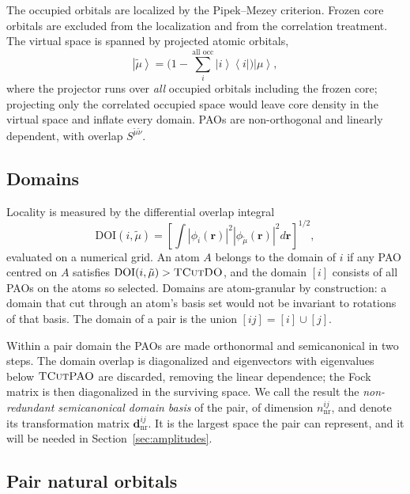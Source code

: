 \documentclass[aip,jcp,amsmath,amssymb,preprint,superscriptaddress]{revtex4-2}%
\newcommand{\ket}[1]{\left|#1\right\rangle}
\newcommand{\bra}[1]{\left\langle#1\right|}
\newcommand{\pao}[1]{\tilde{#1}}
\newcommand{\TCut}[1]{\textsc{TCut#1}}
\begin{document}
The occupied orbitals are localized by the Pipek--Mezey
criterion.\cite{PipekMezey1989} Frozen core orbitals are excluded from the
localization and from the correlation treatment. The virtual space is spanned
by projected atomic orbitals,
%
\begin{equation}
  \ket{\pao{\mu}} = \Big(1 - \sum_{i}^{\text{all occ}}\ket{i}\bra{i}\Big)\ket{\mu},
  \label{eq:pao}
\end{equation}
%
where the projector runs over \emph{all} occupied orbitals including the
frozen core; projecting only the correlated occupied space would leave core
density in the virtual space and inflate every domain. PAOs are non-orthogonal
and linearly dependent, with overlap $S^{\pao{\mu}\pao{\nu}}$.

\subsection{Domains}

Locality is measured by the differential overlap
integral\cite{Pinski2015}
%
\begin{equation}
  \mathrm{DOI}(i,\pao{\mu}) =
    \left[\int \left|\phi_i(\mathbf{r})\right|^2
                \left|\phi_{\pao{\mu}}(\mathbf{r})\right|^2
          d\mathbf{r}\right]^{1/2},
  \label{eq:doi}
\end{equation}
%
evaluated on a numerical grid. An atom $A$ belongs to the domain of $i$ if any
PAO centred on $A$ satisfies $\mathrm{DOI}(i,\pao{\mu}) > \TCut{DO}$, and the
domain $[i]$ consists of all PAOs on the atoms so selected. Domains are
atom-granular by construction: a domain that cut through an atom's basis set
would not be invariant to rotations of that basis. The domain of a pair is the
union $[ij] = [i]\cup[j]$.

Within a pair domain the PAOs are made orthonormal and semicanonical in two
steps. The domain overlap is diagonalized and eigenvectors with eigenvalues
below $\TCut{PAO}$ are discarded, removing the linear dependence; the Fock
matrix is then diagonalized in the surviving space. We call the result the
\emph{non-redundant semicanonical domain basis} of the pair, of dimension
$n^{ij}_{\text{nr}}$, and denote its transformation matrix $\mathbf{d}^{ij}_{\text{nr}}$.
It is the largest space the pair can represent, and it will be needed in
Section~\ref{sec:amplitudes}.

\subsection{Pair natural orbitals}
\end{document}
